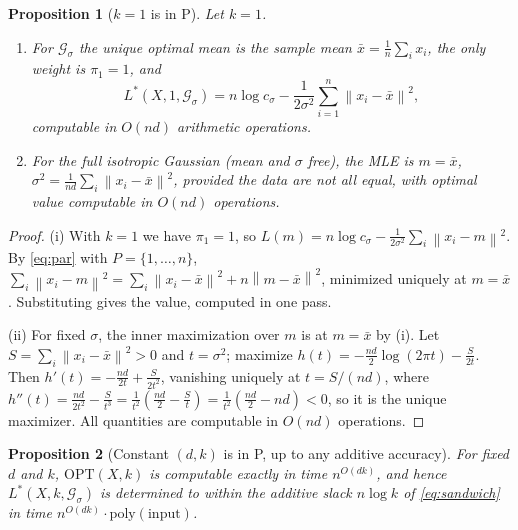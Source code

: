 \documentclass{amsart}
\theoremstyle{plain}
\newtheorem{proposition}{Proposition}
\theoremstyle{definition}
\newcommand{\norm}[1]{\left\lVert #1 \right\rVert}
\begin{document}
\begin{proposition}[$k=1$ is in P]\label{prop:k1}
Let $k=1$.
\begin{enumerate}
\item[(i)] For $\mathcal G_{\sigma}$ the unique optimal mean is the sample mean
$\bar x=\frac1n\sum_{i}x_{i}$, the only weight is $\pi_{1}=1$, and
\[
L^{\ast}(X,1,\mathcal G_{\sigma})=n\log c_{\sigma}-\frac{1}{2\sigma^{2}}\sum_{i=1}^{n}\norm{x_{i}-\bar x}^{2},
\]
computable in $O(nd)$ arithmetic operations.
\item[(ii)] For the full isotropic Gaussian (mean and $\sigma$ free), the MLE is
$m=\bar x$, $\sigma^{2}=\frac{1}{nd}\sum_{i}\norm{x_{i}-\bar x}^{2}$, provided the
data are not all equal, with optimal value computable in $O(nd)$ operations.
\end{enumerate}
\end{proposition}

\begin{proof}
(i) With $k=1$ we have $\pi_{1}=1$, so
$L(m)=n\log c_{\sigma}-\frac{1}{2\sigma^{2}}\sum_{i}\norm{x_{i}-m}^{2}$. By
\eqref{eq:par} with $P=\{1,\dots,n\}$, $\sum_{i}\norm{x_{i}-m}^{2}
=\sum_{i}\norm{x_{i}-\bar x}^{2}+n\norm{m-\bar x}^{2}$, minimized uniquely at
$m=\bar x$. Substituting gives the value, computed in one pass.

(ii) For fixed $\sigma$, the inner maximization over $m$ is at $m=\bar x$ by (i).
Let $S=\sum_{i}\norm{x_{i}-\bar x}^{2}>0$ and $t=\sigma^{2}$; maximize
$h(t)=-\tfrac{nd}{2}\log(2\pi t)-\tfrac{S}{2t}$. Then
$h'(t)=-\tfrac{nd}{2t}+\tfrac{S}{2t^{2}}$, vanishing uniquely at $t=S/(nd)$, where
$h''(t)=\tfrac{nd}{2t^{2}}-\tfrac{S}{t^{3}}=\tfrac{1}{t^{2}}(\tfrac{nd}{2}-\tfrac{S}{t})
=\tfrac{1}{t^{2}}(\tfrac{nd}{2}-nd)<0$, so it is the unique maximizer. All
quantities are computable in $O(nd)$ operations.
\end{proof}

\begin{proposition}[Constant $(d,k)$ is in P, up to any additive accuracy]\label{prop:dk}
For fixed $d$ and $k$, $\mathrm{OPT}(X,k)$ is computable exactly in time
$n^{O(dk)}$, and hence $L^{\ast}(X,k,\mathcal G_{\sigma})$ is determined to within
the additive slack $n\log k$ of \eqref{eq:sandwich} in time $n^{O(dk)}\cdot
\mathrm{poly}(\text{input})$.
\end{proposition}
\end{document}
